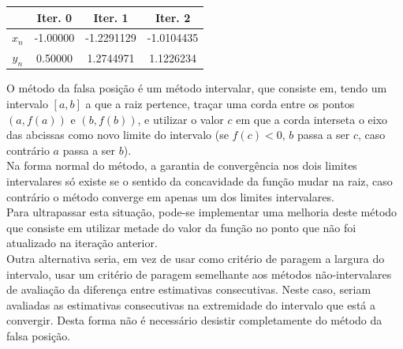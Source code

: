 \documentclass{mnum}
\begin{document}

\begin{center} \begin{tabular}{c | c c c}
	& Iter. 0 & Iter. 1 & Iter. 2\\ \hline
	$x_n$ & -1.00000 & -1.2291129 & -1.0104435 \\
	$y_n$ & 0.50000 & 1.2744971 & 1.1226234
\end{tabular} \end{center}
O método da falsa posição é um método intervalar, que consiste em, tendo um intervalo $[a,b]$ a que a raiz pertence, traçar uma corda entre os pontos $(a, f(a))$ e $(b, f(b))$, e utilizar o valor $c$ em que a corda interseta o eixo das abcissas como novo limite do intervalo (se $f(c) < 0$, $b$ passa a ser $c$, caso contrário $a$ passa a ser $b$).\\
Na forma normal do método, a garantia de convergência nos dois limites intervalares só existe se o sentido da concavidade da função mudar na raiz, caso contrário o método converge em apenas um dos limites intervalares.\\
Para ultrapassar esta situação, pode-se implementar uma melhoria deste método que consiste em utilizar metade do valor da função no ponto que não foi atualizado na iteração anterior.\\
Outra alternativa seria, em vez de usar como critério de paragem a largura do intervalo, usar um critério de paragem semelhante aos métodos não-intervalares de avaliação da diferença entre estimativas consecutivas. Neste caso, seriam avaliadas as estimativas consecutivas na extremidade do intervalo que está a convergir. Desta forma não é necessário desistir completamente do método da falsa posição.
\end{document}
